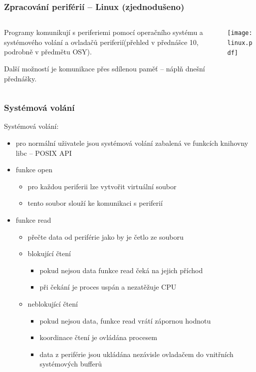 \documentclass{beamer}
\begin{document}
\begin{frame}
\frametitle{Zpracování periférií -- Linux (zjednodušeno)}
\begin{columns}
\begin{column}{0.4\textwidth}
Programy komunikují s periferiemi pomocí operačního systému a systémového volání a ovladačů periferií(přehled v přednášce 10, podrobně v předmětu OSY).

\bigskip
Další možností je komunikace přes sdílenou paměť -- náplň dnešní přednášky.
\end{column}
\begin{column}{0.58\textwidth}  
\texttt{[image: linux.pdf]}
\end{column}
\end{columns}
\end{frame}


\begin{frame}
\frametitle{Systémová volání}

Systémová volání:
\begin{itemize}
\item pro normální uživatele jsou systémová volání zabalená ve funkcích knihovny libc -- POSIX API
\item funkce open
    \begin{itemize}
    \item pro každou periferii lze vytvořit virtuální soubor
    \item tento soubor slouží ke komunikaci s periferií
    \end{itemize}
\item funkce read 
    \begin{itemize}
    \item přečte data od periférie jako by je četlo ze souboru
    \item blokující čtení
        \begin{itemize}
        \item pokud nejsou data funkce read čeká na jejich příchod
        \item při čekání je proces uspán a nezatěžuje CPU
        \end{itemize}
    \item neblokující čtení
        \begin{itemize}
        \item pokud nejsou data, funkce read vrátí zápornou hodnotu 
        \item koordinace čtení je ovládána procesem
        \item data z periférie jsou ukládána nezávisle ovladačem do vnitřních systémových bufferů
        \end{itemize}
    \end{itemize}
\end{itemize}
\end{frame}
\end{document}
